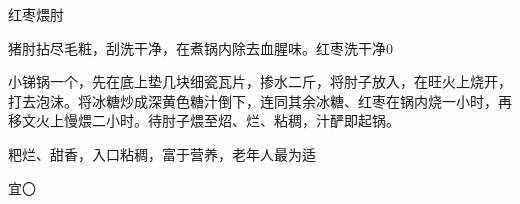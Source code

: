 \begin{recipe}{红枣煨肘}

\ingredients


\cooking

\step 猪肘拈尽毛粧，刮洗干净，在煮锅内除去血腥味。红枣洗干净0

\step 小锑锅一个，先在底上垫几块细瓷瓦片，掺水二斤，将肘子放入，在旺火上烧开，打去泡沫。将冰糖炒成深黄色糖汁倒下，连同其余冰糖、红枣在锅内烧一小时，再移文火上慢煨二小时。待肘子煨至炤、烂、粘稠，汁酽即起锅。

\notes

粑烂、甜香，入口粘稠，富于营养，老年人最为适

宜〇

\end{recipe}

